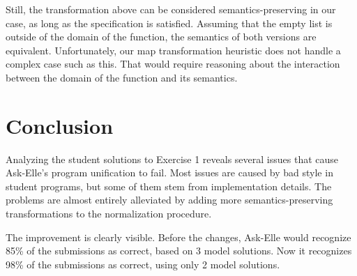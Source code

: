 Still, the transformation above can be considered semantics-preserving in our case, as long as the specification is satisfied. Assuming that the empty list is outside of the domain of the function, the semantics of both versions are equivalent. Unfortunately, our map transformation heuristic does not handle a complex case such as this. That would require reasoning about the interaction between the domain of the function and its semantics.



\section{Conclusion}

Analyzing the student solutions to Exercise 1 reveals several issues that cause Ask-Elle's program unification to fail. Most issues are caused by bad style in student programs, but some of them stem from implementation details. The problems are almost entirely alleviated by adding more semantics-preserving transformations to the normalization procedure.

The improvement is clearly visible. Before the changes, Ask-Elle would recognize 85\% of the submissions as correct, based on 3 model solutions. Now it recognizes 98\% of the submissions as correct, using only 2 model solutions.


